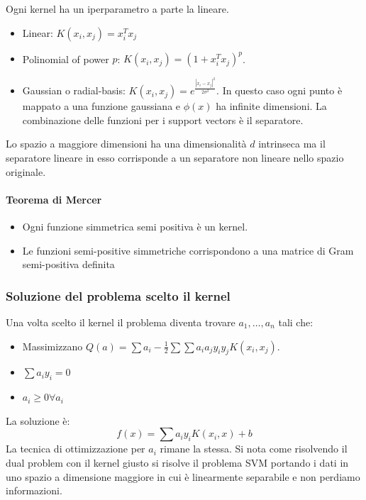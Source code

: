 		Ogni kernel ha un iperparametro a parte la lineare.
		\begin{itemize}
			\item Linear: $K(x_i,x_j) = x_i^Tx_j$
			\item Polinomial of power $p$: $K(x_i, x_j) = (1+x_i^Tx_j)^p$.
			\item Gaussian o radial-basis: $K(x_i, x_j) = e^{\frac{|x_i - x_j|^2}{2\sigma^2}}$.
			In questo caso ogni punto \`e mappato a una funzione gaussiana e $\phi(x)$ ha infinite dimensioni.
			La combinazione delle funzioni per i support vectors \`e il separatore.
		\end{itemize}
		Lo spazio a maggiore dimensioni ha una dimensionalit\`a $d$ intrinseca ma il separatore lineare in esso corrisponde a un separatore non lineare nello spazio originale.
		
		\paragraph{Teorema di Mercer}
		\begin{itemize}
			\item Ogni funzione simmetrica semi positiva \`e un kernel.
			\item Le funzioni semi-positive simmetriche corrispondono a una matrice di Gram semi-positiva definita
		\end{itemize}

		\subsubsection{Soluzione del problema scelto il kernel}
		Una volta scelto il kernel il problema diventa trovare $a_1,\dots,a_n$ tali che:
		\begin{itemize}
			\item Massimizzano $Q(a) = \sum a_i-\frac{1}{2}\sum\sum a_ia_jy_iy_jK(x_i,x_j)$.
			\item $\sum a_iy_i = 0$
			\item $a_i\ge 0\forall a_i$
		\end{itemize}
		La soluzione \`e:
		$$f(x) = \sum a_iy_iK(x_i,x)+b$$
		La tecnica di ottimizzazione per $a_i$ rimane la stessa.
		Si nota come risolvendo il dual problem con il kernel giusto si risolve il problema SVM portando i dati in uno spazio a dimensione maggiore in cui \`e linearmente separabile e non perdiamo informazioni.
